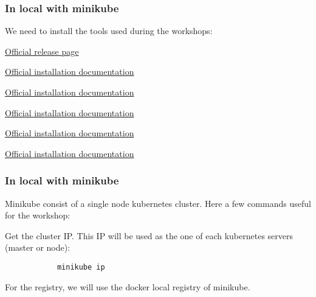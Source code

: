 \begin{frame}
	\frametitle{In local with minikube}
	
	We need to install the tools used during the workshops:
	\begin{description}[leftmargin=!,labelwidth=\widthof{\bfseries Kustomize}]
		\item[Docker] \href{https://hub.docker.com/search/?type=edition&offering=community}{Official release page}
		\item[Kubectl] \href{https://kubernetes.io/docs/tasks/tools/install-kubectl/}{Official installation documentation}
		\item[Minikube] \href{https://kubernetes.io/docs/tasks/tools/install-minikube/}{Official installation documentation}
		\item[Kustomize] \href{https://github.com/kubernetes-sigs/kustomize/blob/master/docs/INSTALL.md}{Official installation documentation}
		\item[Skaffold] \href{https://skaffold.dev/docs/getting-started/\#installing-skaffold}{Official installation documentation}
		\item[Stern] \href{https://github.com/wercker/stern}{Official installation documentation}
	\end{description}	
\end{frame}

\begin{frame}[fragile]
	\frametitle{In local with minikube}
	
	Minikube consist of a single node kubernetes cluster. Here a few commands useful for the workshop:
	
	\begin{block}{Get the cluster IP. This IP will be used as the one of each kubernetes servers (master or node):}
		\begin{verbatim}
			minikube ip
		\end{verbatim}
	\end{block}
	
	\medskip
	For the registry, we will use the docker local registry of minikube.
\end{frame}